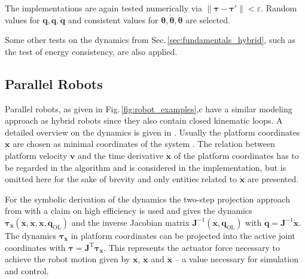 \documentclass[runningheads]{llncs}
\newcommand{\transp}[0]{{\mathrm{T}}}
\begin{document}
\begin{test}\label{test:hyb_dyn}
The implementations are again tested numerically via $\lVert\bm{\tau}{-}\bm{\tau}'\rVert {<} \varepsilon$.
Random values for $\bm{q},\dot{\bm{q}},\ddot{\bm{q}}$ and consistent values for $\bm{\theta},\dot{\bm{\theta}},\ddot{\bm{\theta}}$ are selected.
\end{test}
Some other tests on the dynamics from Sec.\,\ref{sec:fundamentals_hybrid}, such as the test of energy consistency, are also applied.

\subsection{Parallel Robots}
\label{sec:fundamentals_parallel}

%

Parallel robots, as given in Fig.\,\ref{fig:robot_examples},c have a similar modeling approach as hybrid robots since they also contain closed kinematic loops.
A detailed overview on the dynamics is given in \cite{BriotKha2015}.
Usually the platform coordinates $\bm{x}$ are chosen as minimal coordinates of the system \cite{Merlet2006}.
The relation between platform velocity $\bm{v}$ and the time derivative $\dot{\bm{x}}$ of the platform coordinates has to be regarded in the algorithm \cite{Merlet2006,AbdellatifHei2009} and is considered in the implementation, but is omitted here for the sake of brevity and only entities related to $\dot{\bm{x}}$ are presented.


\begin{property}\label{prop:parabdellatif}
For the symbolic derivation of the dynamics the two-step projection approach from \cite{AbdellatifHei2009} with a claim on high efficiency is used and gives the dynamics $\bm{\tau}_{\bm{x}}(\bm{x},\dot{\bm{x}},\ddot{\bm{x}},\bm{q}_{\mathrm{OL}})$ and the inverse Jacobian matrix $\bm{J}^{-1}(\bm{x},\bm{q}_{\mathrm{OL}})$ with $\dot{\bm{q}}{=}\bm{J}^{-1} \dot{\bm{x}}$.
The dynamics $\bm{\tau}_{\bm{x}}$ in platform coordinates can be projected into the active joint coordinates with $\bm{\tau} {=} \bm{J}^\transp \bm{\tau}_{\bm{x}}$.
This represents the actuator force necessary to achieve the robot motion given by $\bm{x}$, $\dot{\bm{x}}$ and $\ddot{\bm{x}}$ -- a value necessary for simulation and control.
\end{property}
	
\end{document}
